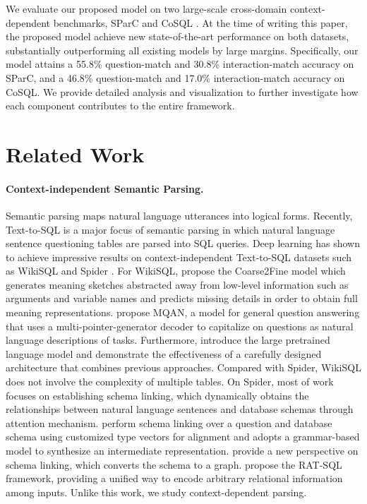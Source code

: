 \documentclass[letterpaper]{article} \usepackage{aaai21}  \usepackage{times}  \usepackage{helvet} \usepackage{courier}  \usepackage[hyphens]{url}  \usepackage{graphicx} \urlstyle{rm} \def\UrlFont{\rm}  \usepackage{natbib}  \usepackage{caption} \frenchspacing  \setlength{\pdfpagewidth}{8.5in}  \setlength{\pdfpageheight}{11in}
\begin{document}
We evaluate our proposed model on two large-scale cross-domain context-dependent benchmarks, SParC \cite{DBLP:conf/acl/YuZYTLLELPCJDPS19} and CoSQL \cite{DBLP:conf/emnlp/YuZELXPLTSLJYSC19}. At the time of writing this paper, the proposed model achieve new state-of-the-art performance on both datasets, substantially outperforming all existing models by large margins. 
Specifically, our model attains a 55.8\% question-match and 30.8\% interaction-match accuracy on SParC, and a 46.8\% question-match and 17.0\% interaction-match accuracy on CoSQL. 
We provide detailed analysis and visualization to further investigate how each component contributes to the entire framework. 


\section{Related Work}

\paragraph{Context-independent Semantic Parsing.}
Semantic parsing \cite{DBLP:conf/aaai/ZelleM96,DBLP:conf/uai/ZettlemoyerC05,DBLP:conf/acl/WongM07,DBLP:conf/emnlp/ZettlemoyerC07} maps natural language utterances into logical forms.
Recently, Text-to-SQL is a major focus of semantic parsing in which natural language sentence questioning tables are parsed into SQL queries.
Deep learning has shown to achieve impressive results on context-independent Text-to-SQL datasets such as WikiSQL \cite{DBLP:journals/corr/abs-1709-00103} and Spider \cite{DBLP:conf/emnlp/YuZYYWLMLYRZR18}.
For WikiSQL, \citet{dong-lapata-2018-coarse} propose the Coarse2Fine model which generates meaning sketches abstracted away from  low-level information  such as arguments and variable names and  predicts missing details in order to obtain full meaning representations.
\citet{DBLP:journals/corr/abs-1806-08730} propose MQAN, a model for general question answering that uses a multi-pointer-generator decoder to capitalize on questions as natural language descriptions of tasks.
Furthermore, \citet{Hwang2019ACE} introduce the large pretrained language model and demonstrate the effectiveness of a carefully designed architecture that combines previous approaches.
Compared with Spider, WikiSQL does not involve the complexity of multiple tables.
On Spider, most of work focuses on establishing schema linking, which dynamically obtains the relationships between natural language sentences and database schemas through attention mechanism.
\citet{DBLP:conf/acl/GuoZGXLLZ19} perform schema linking over a question and database schema using customized type vectors for alignment and adopts a grammar-based model \cite{DBLP:conf/acl/YinN17} to synthesize an intermediate representation.
\citet{DBLP:conf/acl/BoginBG19} provide a new perspective on schema linking, which converts the schema to a graph. 
\citet{DBLP:conf/acl/WangSLPR20} propose the RAT-SQL framework, providing a unified way to encode arbitrary relational information among inputs.
Unlike this work, we study context-dependent parsing. 
\end{document}
